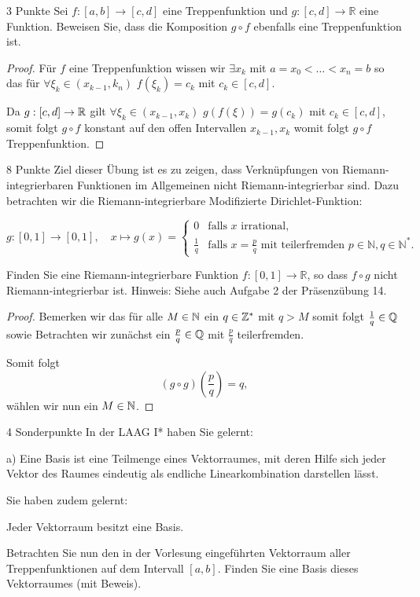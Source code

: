 \documentclass{problemset}
\begin{document}
\begin{problem}{3 Punkte}
Sei $f: [a, b] \to [c, d]$ eine Treppenfunktion und $g: [c, d] \to \mathbb{R}$ eine Funktion. Beweisen Sie, dass die Komposition $g \circ f$ ebenfalls eine Treppenfunktion ist.


\begin{proof}
    Für $f$ eine Treppenfunktion wissen wir $\exists x_k$ mit $a = x_0 < \dots < x_n = b$ so das für $\forall \xi_k \in (x_{k-1}, k_n)$ $f(\xi_k) = c_k$ mit $c_k \in [c,d]$.
    
    Da $g: [c,d] \rightarrow \mathbb{R}$ gilt $\forall \xi_k \in (x_{k-1}, x_k)$ $g(f(\xi)) = g(c_k)$ mit $c_k \in [c,d]$, somit folgt $g \circ f$ konstant auf den offen Intervallen $x_{k-1}, x_k$ womit folgt $g \circ f$ Treppenfunktion. 
\end{proof}


\end{problem}

\begin{problem}{8 Punkte}
Ziel dieser Übung ist es zu zeigen, dass Verknüpfungen von Riemann-integrierbaren Funktionen im Allgemeinen nicht Riemann-integrierbar sind. Dazu betrachten wir die Riemann-integrierbare Modifizierte Dirichlet-Funktion:

\[ g: [0, 1] \to [0, 1], \quad x \mapsto g(x) = \begin{cases}
    0 & \text{falls } x \text{ irrational}, \\
    \frac{1}{q} & \text{falls } x = \frac{p}{q} \text{ mit teilerfremden } p \in \mathbb{N}, q \in \mathbb{N}^*.
\end{cases} \]

Finden Sie eine Riemann-integrierbare Funktion $f: [0, 1] \to \mathbb{R}$, so dass $f \circ g$ nicht Riemann-integrierbar ist. Hinweis: Siehe auch Aufgabe 2 der Präsenzübung 14.

\begin{proof}
    Bemerken wir das für alle $M \in \mathbb{N}$ ein $q \in \mathbb{Z}^*$ mit $q > M$ somit folgt $\frac{1}{q} \in \mathbb{Q}$ sowie 
    Betrachten wir zunächst ein $\frac{p}{q} \in \mathbb{Q}$ mit $\frac{p}{q}$ teilerfremden. 

    Somit folgt \[
        (g \circ g)\left(\frac{p}{q}\right) = q,
    \] wählen wir nun ein $M \in \mathbb{N}$.
\end{proof}

\end{problem}

\begin{problem}{4 Sonderpunkte}
In der LAAG I* haben Sie gelernt:

a) Eine Basis ist eine Teilmenge eines Vektorraumes, mit deren Hilfe sich jeder Vektor des Raumes eindeutig als endliche Linearkombination darstellen lässt.

Sie haben zudem gelernt:

Jeder Vektorraum besitzt eine Basis.

Betrachten Sie nun den in der Vorlesung eingeführten Vektorraum aller Treppenfunktionen auf dem Intervall $[a, b]$. Finden Sie eine Basis dieses Vektorraumes (mit Beweis).
\end{problem}
\end{document}
